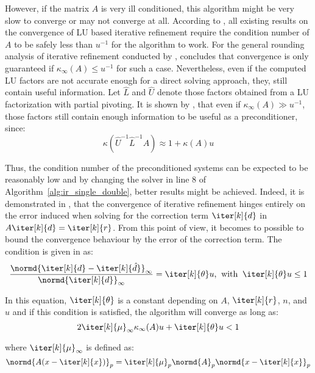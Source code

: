 However, if the matrix $A$ is very ill conditioned, this algorithm might be very slow to converge or may not converge at all. According to \cite{carson_accelerating_2018}, all existing results on the convergence of LU based iterative refinement require the condition number of $A$ to be safely less than $u^{-1}$ for the algorithm to work. For the general rounding analysis of iterative refinement conducted by \cite{higham_accuracy_2002}, concludes that convergence is only guaranteed if $\kappa_\infty(A)\leq u^{-1}$ for such a case. Nevertheless, even if the computed LU factors are not accurate enough for a direct solving approach, they, still contain useful information. Let $\hat{L}$ and $\hat{U}$ denote those factors obtained from a LU factorization with partial pivoting. It is shown by \cite{carson_new_2017}, that even if $\kappa_\infty(A) \gg u^{-1}$, those factors still contain enough information to be useful as a preconditioner, since:
\begin{equation}
    \kappa(\hat{U}^{-1}\hat{L}^{-1}A)\approx 1 + \kappa(A)u
\end{equation}

\noindent Thus, the condition number of the preconditioned systems can be expected to be reasonably low and by changing the solver in line 8 of Algorithm~\hyperref[alg:ir_single_double]{\ref{alg:ir_single_double}}, better results might be achieved. Indeed, it is demonstrated in \cite{carson_new_2017}, that the convergence of iterative refinement hinges entirely on the error induced when solving for the correction term $\iter[k]{d}$ in $A\iter[k]{d} = \iter[k]{r}$. From this point of view, it becomes to possible to bound the convergence behaviour by the error of the correction term. The condition is given in \cite{carson_new_2017} as:
\begin{equation}
\label{eqn:ir_error}
    \frac{\normd{\iter[k]{d}-\iter[k]{\hat{d}}}_\infty}{\normd{\iter[k]{d}}_\infty} =\iter[k]{\theta}u\text{,} \;\;\text{with} \;\; \iter[k]{\theta}u\leq 1
\end{equation}

\noindent In this equation, $\iter[k]{\theta}$ is a constant depending on $A$, $\iter[k]{r}$, $n$, and $u$ and if this condition is satisfied, the algorithm will converge as long as:
\begin{equation}
  2\iter[k]{\mu}_\infty\kappa_\infty(A)u+\iter[k]{\theta}u<1
\end{equation}

\noindent where $\iter[k]{\mu}_\infty$ is defined as:
\begin{equation}
\normd{A(x-\iter[k]{x})}_p = \iter[k]{\mu}_p \normd{A}_p\normd{x-\iter[k]{x}}_p
\end{equation}

